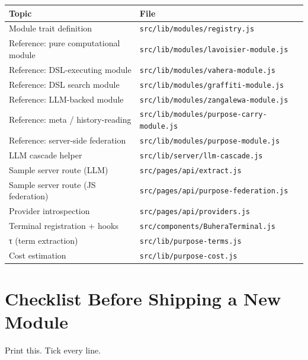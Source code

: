 \documentclass[11pt,a4paper]{article}
\theoremstyle{contract}
\begin{document}
\begin{center}
\begin{tabularx}{\linewidth}{lX}
\toprule
\textbf{Topic} & \textbf{File} \\
\midrule
Module trait definition & \texttt{src/lib/modules/registry.js} \\
Reference: pure computational module & \texttt{src/lib/modules/lavoisier-module.js} \\
Reference: DSL-executing module & \texttt{src/lib/modules/vahera-module.js} \\
Reference: DSL search module & \texttt{src/lib/modules/graffiti-module.js} \\
Reference: LLM-backed module & \texttt{src/lib/modules/zangalewa-module.js} \\
Reference: meta / history-reading & \texttt{src/lib/modules/purpose-carry-module.js} \\
Reference: server-side federation & \texttt{src/lib/modules/purpose-module.js} \\
LLM cascade helper & \texttt{src/lib/server/llm-cascade.js} \\
Sample server route (LLM) & \texttt{src/pages/api/extract.js} \\
Sample server route (JS federation) & \texttt{src/pages/api/purpose-federation.js} \\
Provider introspection & \texttt{src/pages/api/providers.js} \\
Terminal registration + hooks & \texttt{src/components/BuheraTerminal.js} \\
τ (term extraction) & \texttt{src/lib/purpose-terms.js} \\
Cost estimation & \texttt{src/lib/purpose-cost.js} \\
\bottomrule
\end{tabularx}
\end{center}

\section{Checklist Before Shipping a New Module}
\label{sec:checklist}

Print this. Tick every line.
\end{document}
